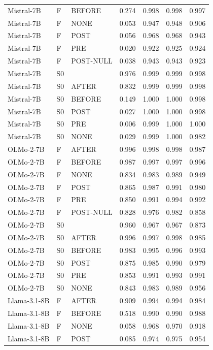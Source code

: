 \begin{tabular}{lllcccc}
Mistral-7B & F & BEFORE & 0.274 & 0.998 & 0.998 & 0.997 \\
Mistral-7B & F & NONE & 0.053 & 0.947 & 0.948 & 0.906 \\
Mistral-7B & F & POST & 0.056 & 0.968 & 0.968 & 0.943 \\
Mistral-7B & F & PRE & 0.020 & 0.922 & 0.925 & 0.924 \\
Mistral-7B & F & POST-NULL & 0.038 & 0.943 & 0.943 & 0.923 \\
Mistral-7B & S0 & \fmtOpt{} & 0.976 & 0.999 & 0.999 & 0.998 \\
Mistral-7B & S0 & AFTER & 0.832 & 0.999 & 0.999 & 0.998 \\
Mistral-7B & S0 & BEFORE & 0.149 & 1.000 & 1.000 & 0.998 \\
Mistral-7B & S0 & POST & 0.027 & 1.000 & 1.000 & 0.998 \\
Mistral-7B & S0 & PRE & 0.006 & 0.999 & 1.000 & 1.000 \\
Mistral-7B & S0 & NONE & 0.029 & 0.999 & 1.000 & 0.982 \\
OLMo-2-7B & F & AFTER & 0.996 & 0.998 & 0.998 & 0.987 \\
OLMo-2-7B & F & BEFORE & 0.987 & 0.997 & 0.997 & 0.996 \\
OLMo-2-7B & F & NONE & 0.834 & 0.983 & 0.989 & 0.949 \\
OLMo-2-7B & F & POST & 0.865 & 0.987 & 0.991 & 0.980 \\
OLMo-2-7B & F & PRE & 0.850 & 0.991 & 0.994 & 0.992 \\
OLMo-2-7B & F & POST-NULL & 0.828 & 0.976 & 0.982 & 0.858 \\
OLMo-2-7B & S0 & \fmtOpt{} & 0.960 & 0.967 & 0.967 & 0.873 \\
OLMo-2-7B & S0 & AFTER & 0.996 & 0.997 & 0.998 & 0.985 \\
OLMo-2-7B & S0 & BEFORE & 0.983 & 0.995 & 0.996 & 0.993 \\
OLMo-2-7B & S0 & POST & 0.875 & 0.985 & 0.990 & 0.979 \\
OLMo-2-7B & S0 & PRE & 0.853 & 0.991 & 0.993 & 0.991 \\
OLMo-2-7B & S0 & NONE & 0.843 & 0.983 & 0.989 & 0.956 \\
Llama-3.1-8B & F & AFTER & 0.909 & 0.994 & 0.994 & 0.984 \\
Llama-3.1-8B & F & BEFORE & 0.518 & 0.990 & 0.990 & 0.988 \\
Llama-3.1-8B & F & NONE & 0.058 & 0.968 & 0.970 & 0.918 \\
Llama-3.1-8B & F & POST & 0.085 & 0.974 & 0.975 & 0.954 \\

\end{tabular}
